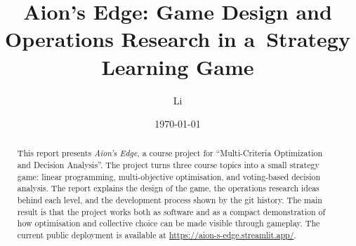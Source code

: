 \documentclass[11pt,a4paper]{article}
\title{Aion's Edge: Game Design and Operations Research in a\
Strategy Learning Game}
\author{Li}
\date{\today}
\begin{document}
\maketitle

\begin{abstract}
This report presents \emph{Aion's Edge}, a course project for
``Multi-Criteria Optimization and Decision Analysis''. The project turns
three course topics into a small strategy game: linear programming,
multi-objective optimisation, and voting-based decision analysis. The
report explains the design of the game, the operations research ideas
behind each level, and the development process shown by the git history.
The main result is that the project works both as software and as a
compact demonstration of how optimisation and collective choice can be
made visible through gameplay. The current public deployment is available
at \url{https://aion-s-edge.streamlit.app/}.
\end{abstract}

\tableofcontents




\end{document}
